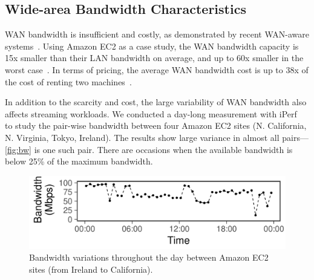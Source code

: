 

\subsection{Wide-area Bandwidth Characteristics}
\label{sec:wide-area-bandwidth}

WAN bandwidth is insufficient and costly, as demonstrated by recent WAN-aware
systems~\cite{hsieh17gaia, pu2015low, vulimiri2015wananlytics,
  vulimiri2015global}. Using Amazon EC2 as a case study, the WAN bandwidth
capacity is 15x smaller than their LAN bandwidth on average, and up to 60x
smaller in the worst case~\cite{hsieh17gaia}. In terms of pricing, the average
WAN bandwidth cost is up to 38x of the cost of renting two
machines~\cite{amazon2017pricing, hsieh17gaia}.

In addition to the scarcity and cost, the large variability of WAN bandwidth
also affects streaming workloads. We conducted a day-long measurement with
iPerf~\cite{iperf3} to study the pair-wise bandwidth between four Amazon EC2
sites (N. California, N. Virginia, Tokyo, Ireland).  The results show large
variance in almost all pairs---\autoref{fig:bw} is one such pair. There are
occasions when the available bandwidth is below 25\% of the maximum bandwidth.

\begin{figure}
  \centering
  \includegraphics[width=0.9\linewidth]{figures/aws-variation.pdf}
  \vspace{-0.8em}
  \caption{Bandwidth variations throughout the day between Amazon EC2 sites
    (from Ireland to California).}
  \label{fig:bw}
  \vspace{-1em}
\end{figure}

